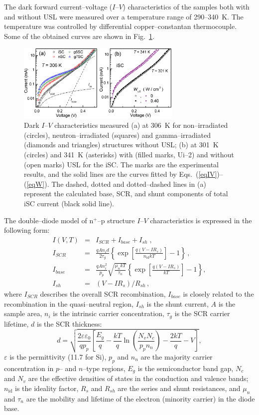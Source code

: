 \documentclass[aip,jap, amsmath,amssymb,reprint]{revtex4-1}
\begin{document}
The dark forward current--voltage ($I$--$V$) characteristics of the samples both with and without USL were measured over a temperature range of 290--340~K.
The temperature was controlled by differential copper--constantan thermocouple.
Some of the obtained curves are shown in Fig.~\ref{figIV}.


\begin{figure}
\includegraphics[width=0.7\textwidth]{fig_1ab}%
\caption{\label{figIV}
Dark $I$--$V$ characteristics measured (a) at 306~K for non--irradiated (circles), neutron--irradiated (squares) and gamma--irradiated (diamonds and triangles) structures without USL;
(b) at 301~K (circles) and 341~K (asterisks) with (filled marks, Ui--2) and without (open marks) USL for the iSC.
The marks are the experimental results, and the solid lines are the curves  fitted by Eqs.~(\ref{eqIV})--(\ref{eqW}).
The dashed, dotted and dotted--dashed lines in (a) represent the calculated base, SCR, and shunt components of total iSC current (black solid line).
}%
\end{figure}


The double--diode model of n$^+$--p structure $I$--$V$ characteristics is expressed in the following form:
\begin{eqnarray}
I(V,T)&=&I_{SCR}+I_{base}+I_{sh}\;,\label{eqIV}\\
I_{SCR}&=&\frac{qAn_id}{2\tau_{g}}\left\{\exp \left[\frac{q(V-IR_s)}{n_{\mathrm{id}}kT}\right]-1\right\}\,,\label{eqIscr}\\
I_{base}&=&\frac{qAn_i^2}{p_p}\sqrt{\frac{\mu_nkT}{\tau_n}}\left\{\exp \left[\frac{q(V-IR_s)}{kT}\right]-1\right\},\label{eqIbase}\\
I_{sh}&=&(V-IR_s)/R_{sh}\,,\label{eqIsh}
\end{eqnarray}
where
$I_{SCR}$ describes the overall SCR recombination,
$I_{base}$ is closely related to the recombination in the quasi--neutral region,
$I_{sh}$ is the shunt current,
$A$ is the sample area,
$n_i$ is the intrinsic carrier concentration,
$\tau_{g}$ is the SCR carrier lifetime,
$d$ is the  SCR thickness:
\begin{equation}
\label{eqW}
    d=\sqrt{\frac{2 \varepsilon \varepsilon_0}{q p_p}\left[
     \frac{E_g}{q}-\frac{kT}{q}\ln\!\left(\frac{N_vN_c}{p_pn_n}\right)-\frac{2kT}{q}-V\right]},
\end{equation}
$\varepsilon$ is the permittivity (11.7 for Si),
$p_p$ and $n_n$ are the majority carrier concentration in $p$-- and $n$--type regions,
$E_g$ is the semiconductor band gap,
$N_c$ and $N_v$ are the effective densities of states in the conduction and valence bands;
$n_{\mathrm{id}}$ is the ideality factor,
$R_s$ and $R_{sh}$ are the series and shunt resistances,
and $\mu_n$ and $\tau_n$ are the mobility and lifetime of the electron (minority carrier) in the diode base.
\end{document}
